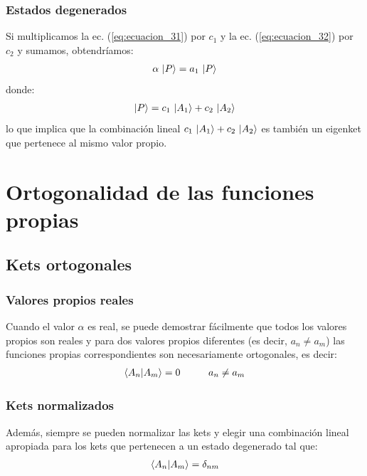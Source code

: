 \documentclass[12pt]{beamer}
\begin{document}
\begin{frame}
\frametitle{Estados degenerados}
Si multiplicamos la ec. (\ref{eq:ecuacion_31}) por $c_{1}$ y la ec. (\ref{eq:ecuacion_32}) por $c_{2}$ y sumamos, obtendríamos:
\pause
\begin{align*}
\alpha \, \ket{P} = a_{1} \, \ket{P}
\end{align*}
donde:
\pause
\begin{align*}
\ket{P} = c_{1} \, \ket{A_{1}} + c_{2} \, \ket{A_{2}}
\end{align*}
lo que implica que la combinación lineal $c_{1} \, \ket{A_{1}} + c_{2} \, \ket{A_{2}}$ es también un eigenket que pertenece al mismo valor propio. %
\end{frame}

\section{Ortogonalidad de las funciones propias}
\subsection{Kets ortogonales}

\begin{frame}
\frametitle{Valores propios reales}
Cuando el valor $\alpha$ es real, se puede demostrar fácilmente que todos los valores propios son reales \pause y para dos valores propios diferentes (es decir, $a_{n} \neq a_{m}$) \pause las funciones propias correspondientes son necesariamente ortogonales, es decir:
\pause
\begin{align*}
\ip{A_n}{A_{m}} = 0 \hspace{1cm} a_{n} \neq a_{m}
\end{align*}
\end{frame}
\begin{frame}
\frametitle{Kets normalizados}
Además, siempre se pueden normalizar las kets y elegir una combinación lineal apropiada para los kets que pertenecen a un estado degenerado tal que:
\begin{align*}
\ip{A_{n}}{A_{m}} = \delta_{n m}
\end{align*}
\end{frame}
\end{document}
